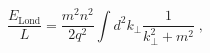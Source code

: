\begin{equation}
\frac{E_{\mathrm{Lond}}}{L}=\frac{m^{2}n^{2}}{2q^{2}}\int d^{2}k_{\bot }%
\frac{1}{k_{\bot }^{2}+m^{2}}\;,  \label{luv}
\end{equation}

